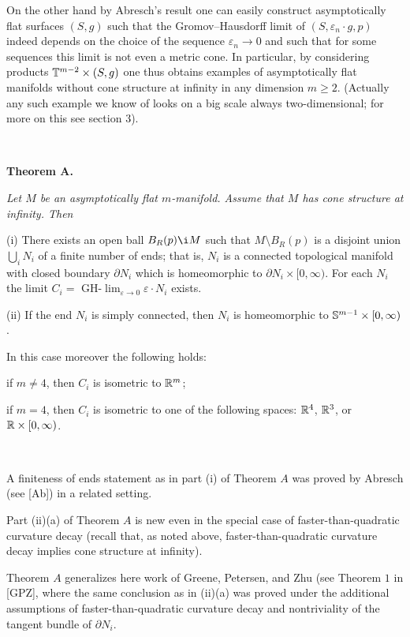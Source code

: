 On the other hand by Abresch's result one can easily construct
asymptotically flat surfaces $(S,g)$
such that the Gromov--Hausdorff limit 
of $(S,\varepsilon_n{\cdot} g,p)$ indeed depends on the choice of the 
sequence $\varepsilon_n\to 0$
and such that for some sequences this limit is not even a metric cone.
In particular, by considering products ${\Bbb T}^{m-2}\times (S,g)$  
one thus obtains examples 
of asymptotically flat manifolds without cone structure at infinity 
in any dimension $m\ge 2$.
(Actually any such example we know of
looks on a big scale always two-dimensional;
for more on this see section $3$).
 

\

 
\noindent 
{\bf Theorem A.\ts}
{\sl 
Let $M$ be an asymptotically flat $m$-manifold.  Assume 
that $M$ has cone structure at infinity. 
Then  
 
\item{(i)}  
There exists an open ball $B_R(p)\i M$
such that $M\setminus B_R(p)$ is a disjoint 
union $\bigcup_i N_i$ of a finite number of ends;  
that is,  $N_i$ is a connected topological manifold with closed boundary 
$\partial N_i$
which is homeomorphic to $\partial N_i\times [0,\infty)$.
For each $N_i$ the limit $C_i=$
GH-$\lim_{\varepsilon\to 0} \varepsilon{\cdot} N_i$ exists.

 
 
 
\item{(ii)} If the end $N_i$ is simply connected, 
then $N_i$ is homeomorphic to ${\Bbb S}^{m-1}\times [0,\infty)$.

In this case moreover the following holds:
 
 if $m\not=4$, then $C_i$ is isometric to ${\Bbb R}^m$;
 
 if $m=4$, then 
$C_i$ is isometric to one of the following spaces:
${\Bbb R}^4$, ${\Bbb R}^3$, or ${\Bbb R}\times [0,\infty)$.
}

 
\ 


A finiteness of ends statement as in part (i) of Theorem $A$ 
was proved by Abresch (see [Ab]) in a related setting.

Part (ii)(a) of Theorem $A$
is new even in the special case of faster-than-quadratic curvature decay
(recall that, as noted above,
faster-than-quadratic curvature decay
implies cone structure at infinity).

Theorem $A$ generalizes here 
work of Greene, Petersen, and Zhu 
(see Theorem $1$ in [GPZ], 
where the same conclusion as in (ii)(a) was proved 
under the additional assumptions of 
faster-than-quadratic curvature decay
and nontriviality of the tangent bundle of $\partial N_i$.

